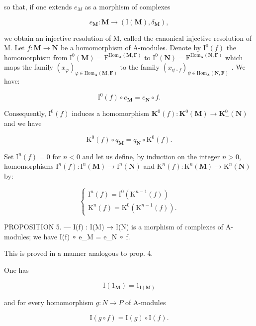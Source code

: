so that, if one extends \(e_{M}\) as a morphism of complexes

\[
e _ {\mathbf {M}}: \mathbf {M} \rightarrow (\mathrm{I} (\mathbf {M}), \delta_ {\mathbf {M}}),
\]

we obtain an injective resolution of M, called the canonical injective resolution of M. Let \(f: \mathbf{M} \to \mathbf{N}\) be a homomorphism of A-modules. Denote by \(\mathrm{I}^{0}(f)\) the homomorphism from \(\mathrm{I}^{0}(\mathbf{M}) = \mathrm{F}^{\mathrm{Hom}_{\mathbf{A}}(\mathbf{M},\mathbf{F})}\) to \(\mathrm{I}^{0}(\mathbf{N}) = \mathrm{F}^{\mathrm{Hom}_{\mathbf{A}}(\mathbf{N},\mathbf{F})}\) which maps the family \((x_{\varphi})_{\varphi \in \mathrm{Hom}_{\mathbf{A}}(\mathbf{M},\mathbf{F})}\) to the family \((x_{\psi \circ f})_{\psi \in \mathrm{Hom}_{\mathbf{A}}(\mathbf{N},\mathbf{F})}\) . We have:

\[
\mathrm{I} ^ {0} (f) \circ e _ {\mathbf {M}} = e _ {\mathbf {N}} \circ f.\tag{11}
\]

Consequently, \(\mathrm{I}^0 (f)\) induces a homomorphism \(\mathbf{K}^0 (f):\mathbf{K}^0 (\mathbf{M})\to \mathbf{K}_-^0 (\mathbf{N})\) and we have

\[
\mathrm{K} ^ {0} (f) \circ q _ {\mathbf {M}} = q _ {\mathbf {N}} \circ \mathrm{K} ^ {0} (f).\tag{12}
\]

Set \(\mathrm{I}^n(f) = 0\) for \(n < 0\) and let us define, by induction on the integer \(n > 0\), homomorphisms \(\mathrm{I}^n(f): \mathrm{I}^n(\mathbf{M}) \to \mathrm{I}^n(\mathbf{N})\) and \(\mathrm{K}^n(f): \mathrm{K}^n(\mathbf{M}) \to \mathrm{K}^n(\mathbf{N})\) by:

\[
\left\{ \begin{array}{l} \mathrm{I} ^ {n} (f) = \mathrm{I} ^ {0} (\mathrm{K} ^ {n - 1} (f)) \\ \mathrm{K} ^ {n} (f) = \mathrm{K} ^ {0} (\mathrm{K} ^ {n - 1} (f)). \end{array} \right.\tag{13}
\]

PROPOSITION 5. --- I(f) : I(M) → I(N) is a morphism of complexes of A-modules; we have I(f) ∘ e\_M = e\_N ∘ f.

This is proved in a manner analogous to prop. 4.

One has

\[
\mathrm{I} (1 _ {\mathbf {M}}) = 1 _ {\mathrm{I} (\mathbf {M})}\tag{14}
\]

and for every homomorphism \(g: N \rightarrow P\) of A-modules

\[
\mathrm{I} (g \circ f) = \mathrm{I} (g) \circ \mathrm{I} (f).\tag{15}
\]

